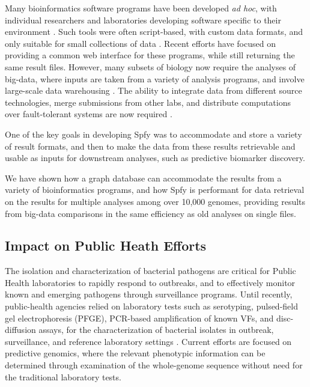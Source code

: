 \documentclass{article}
\begin{document}
Many bioinformatics software programs have been developed \textit{ad hoc}, with individual researchers and laboratories developing software specific to their environment \cite{de2015trends}.
Such tools were often script-based, with custom data formats, and only suitable for small collections of data \cite{de2015trends}.
Recent efforts \cite{goecks2010galaxy,thomsen2016bacterial} have focused on providing a common web interface for these programs, while still returning the same result files.
However, many subsets of biology now require the analyses of big-data, where inputs are taken from a variety of analysis programs, and involve large-scale data warehousing \cite{schatz2015biological}.
The ability to integrate data from different source technologies, merge submissions from other labs, and distribute computations over fault-tolerant systems are now required \cite{schatz2015biological}.

One of the key goals in developing Spfy was to accommodate and store a variety of result formats, and then to make the data from these results retrievable and usable as inputs for downstream analyses, such as predictive biomarker discovery.

We have shown how a graph database can accommodate the results from a variety of bioinformatics programs, and how Spfy is performant for data retrieval on the results for multiple analyses among over 10,000 genomes, providing results from big-data comparisons in the same efficiency as old analyses on single files.

\subsection{Impact on Public Heath Efforts}

The isolation and characterization of bacterial pathogens are critical for Public Health laboratories to rapidly respond to outbreaks, and to effectively monitor known and emerging pathogens through surveillance programs.
Until recently, public-health agencies relied on laboratory tests such as serotyping, pulsed-field gel electrophoresis (PFGE), PCR-based amplification of known VFs, and disc-diffusion assays, for the characterization of bacterial isolates in outbreak, surveillance, and reference laboratory settings \cite{ronholm2016navigating}. Current efforts are focused on predictive genomics, where the relevant phenotypic information can be determined through examination of the whole-genome sequence without need for the traditional laboratory tests.
\end{document}
